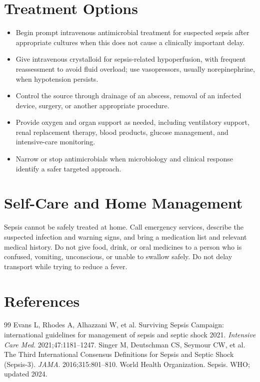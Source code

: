 \section*{Treatment Options}
\begin{itemize}
  \item Begin prompt intravenous antimicrobial treatment for suspected sepsis after appropriate cultures when this does not cause a clinically important delay.
  \item Give intravenous crystalloid for sepsis-related hypoperfusion, with frequent reassessment to avoid fluid overload; use vasopressors, usually norepinephrine, when hypotension persists.
  \item Control the source through drainage of an abscess, removal of an infected device, surgery, or another appropriate procedure.
  \item Provide oxygen and organ support as needed, including ventilatory support, renal replacement therapy, blood products, glucose management, and intensive-care monitoring.
  \item Narrow or stop antimicrobials when microbiology and clinical response identify a safer targeted approach.
\end{itemize}

\section*{Self-Care and Home Management}
Sepsis cannot be safely treated at home. Call emergency services, describe the suspected infection and warning signs, and bring a medication list and relevant medical history. Do not give food, drink, or oral medicines to a person who is confused, vomiting, unconscious, or unable to swallow safely. Do not delay transport while trying to reduce a fever.

\section*{References}
\begin{thebibliography}{99}
 Evans L, Rhodes A, Alhazzani W, et al. Surviving Sepsis Campaign: international guidelines for management of sepsis and septic shock 2021. \textit{Intensive Care Med}. 2021;47:1181--1247.
 Singer M, Deutschman CS, Seymour CW, et al. The Third International Consensus Definitions for Sepsis and Septic Shock (Sepsis-3). \textit{JAMA}. 2016;315:801--810.
 World Health Organization. Sepsis. WHO; updated 2024.
\end{thebibliography}
